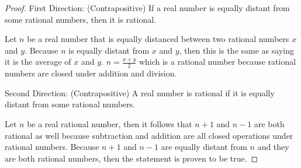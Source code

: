 \documentclass[11pt]{article}
\begin{document}
\begin{proof}
	First Direction: (Contrapositive) If a real number is equally distant from some rational numbers, then it is rational.

	Let $n$ be a real number that is equally distanced between two rational numbers $x$ and $y$. Because $n$ is equally distant from $x$ and $y$, then this is the same as saying it is the average of $x$ and $y$. $n = \frac{x+y}{2}$ which is a rational number because rational numbers are closed under addition and division.

	Second Direction: (Contrapositive) A real number is rational if it is equally distant from some rational numbers.

	Let $n$ be a real rational number, then it follows that $n+1$ and $n-1$ are both rational as well because subtraction and addition are all closed operations under rational numbers. Because $n+1$ and $n-1$ are equally distant from $n$ and they are both rational numbers, then the statement is proven to be true.
\end{proof}







	
\end{document}
